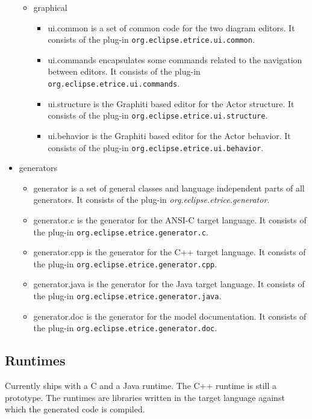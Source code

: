 \begin{itemize}
\begin{itemize}
\item graphical
\begin{itemize}
\item ui.common is a set of common code for the two diagram editors. It consists of the plug-in 
\texttt{org.eclipse.etrice.ui.common}.
\item ui.commands encapsulates some commands related to the navigation between \eTrice{} editors. It consists 
of the plug-in \texttt{org.eclipse.etrice.ui.commands}.
\item ui.structure is the Graphiti based editor for the Actor structure. It consists of the plug-in 
\texttt{org.eclipse.etrice.ui.structure}.
\item ui.behavior is the Graphiti based editor for the Actor behavior. It consists of the plug-in 
\texttt{org.eclipse.etrice.ui.behavior}.
\end{itemize}
\end{itemize}

\item generators
\begin{itemize}
\item generator is a set of general classes and language independent parts of all generators. It consists 
of the plug-in \textit{org.eclipse.etrice.generator}.
\item generator.c is the generator for the ANSI-C target language. It consists of the plug-in 
\texttt{org.eclipse.etrice.generator.c}.
\item generator.cpp is the generator for the C++ target language. It consists of the plug-in 
\texttt{org.eclipse.etrice.generator.cpp}.
\item generator.java is the generator for the Java target language. It consists of the plug-in 
\texttt{org.eclipse.etrice.generator.java}.
\item generator.doc is the generator for the model documentation. It consists of the plug-in 
\texttt{org.eclipse.etrice.generator.doc}.
\end{itemize}
\end{itemize}

\subsection{Runtimes}

Currently \eTrice{} ships with a C and a Java runtime. The C++ runtime is still a prototype.
The runtimes are libraries written in the target 
language against which the generated code is compiled.

